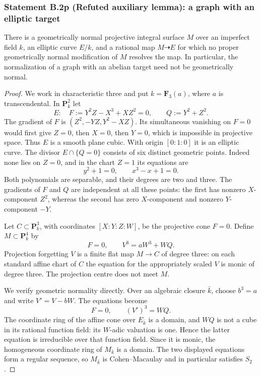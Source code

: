 \subsubsection*{Statement B.2p (Refuted auxiliary lemma): a graph with an elliptic target}
\begin{proposition}
\label{B:B2-abelian-graph-counterexample}
There is a geometrically normal projective integral surface $M$
over an imperfect field $k$, an elliptic curve $E/k$, and a rational
map $M\dashrightarrow E$ for which no proper geometrically normal
modification of $M$ resolves the map.  In particular, the normalization
of a graph with an abelian target need not be geometrically normal.
\end{proposition}
\begin{proof}
We work in characteristic three and put $k=\mathbf F_3(a)$, where
$a$ is transcendental.  In $\mathbf P^2_k$ let
\[
 E:\quad F:=Y^2Z-X^3+XZ^2=0,\qquad Q:=Y^2+Z^2.
\]
The gradient of $F$ is
$(Z^2,-YZ,Y^2-XZ)$.  Its simultaneous vanishing on $F=0$
would first give $Z=0$, then $X=0$, then $Y=0$, which is
impossible in projective space.  Thus $E$ is a smooth plane cubic.
With origin $[0:1:0]$ it is an elliptic curve.  The divisor
$E\cap\{Q=0\}$ consists of six distinct geometric points.
Indeed none lies on $Z=0$, and in the chart $Z=1$ its equations
are
\[
                    y^2+1=0,\qquad x^3-x+1=0.
\]
Both polynomials are separable, and their degrees are two and
three.  The gradients of $F$ and $Q$ are independent at all
these points: the first has nonzero $X$-component $Z^2$,
whereas the second has zero $X$-component and nonzero
$Y$-component $-Y$.

Let $C\subset\mathbf P^3_k$, with coordinates $[X:Y:Z:W]$,
be the projective cone $F=0$.  Define $M\subset\mathbf P^4_k$
by
\[
          F=0,\qquad V^3=aW^3+WQ.
          \tag{B.2.7}
\]
Projection forgetting $V$ is a finite flat map $M\to C$ of
degree three: on each standard affine chart of $C$ the equation
for the appropriately scaled $V$ is monic of degree three.
The projection centre does not meet $M$.

We verify geometric normality directly.  Over an algebraic closure
$\bar k$, choose $b^3=a$ and write $V'=V-bW$.  The equations
become
\[
                         F=0,\qquad (V')^3=WQ.
\]
The coordinate ring of the affine cone over $E_{\bar k}$ is a
domain, and $WQ$ is not a cube in its rational function field:
its $W$-adic valuation is one.  Hence the latter equation is
irreducible over that function field.  Since it is monic, the
homogeneous coordinate ring of $M_{\bar k}$ is a domain.
The two displayed equations form a regular sequence, so
$M_{\bar k}$ is Cohen--Macaulay and in particular satisfies $S_2$.


\end{proof}
